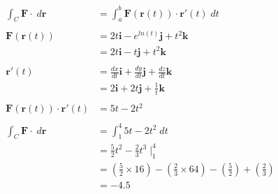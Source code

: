 \documentclass[a4paper,11pt]{article}
\begin{document}
\begin{preview}
\begin{enumerate}
\begin{enumerate}
    \begin{align*}
        \int_C \textbf{F} \cdot \; d \textbf{r} &= \int_a^b \textbf{F}(\textbf{r}(t)) \cdot \textbf{r}' (t) \; dt\\\\
        \textbf{F}(\textbf{r}(t)) &= 2t \textbf{i} - e^{ln(t)} \textbf{j} + t^2 \textbf{k}\\
        &= 2t \textbf{i} - t \textbf{j} + t^2 \textbf{k}\\\\
        \textbf{r}' (t) &= \frac{dx}{dt} \textbf{i} + \frac{dy}{dt} \textbf{j} +  \frac{dz}{dt} \textbf{k}\\
        &= 2 \textbf{i} + 2t \textbf{j} + \frac{1}{t} \textbf{k}\\\\
        \textbf{F}(\textbf{r}(t)) \cdot \textbf{r}' (t) &= 5t - 2t^2 \\\\
        \int_C \textbf{F} \cdot \; d \textbf{r} &= \int_1^4 5t - 2t^2 \; dt\\
        &= \frac{5}{2}t^2 - \frac{2}{3}t^3 \; \Big|_{1}^{4}\\
        &= \left(\frac{5}{2} \times 16\right) - \left(\frac{2}{3} \times 64 \right) - \left(\frac{5}{2}\right) + \left(\frac{2}{3} \right)\\
        &= -4.5
    \end{align*}
\end{enumerate}

\end{enumerate}

\end{preview}
\end{document}
